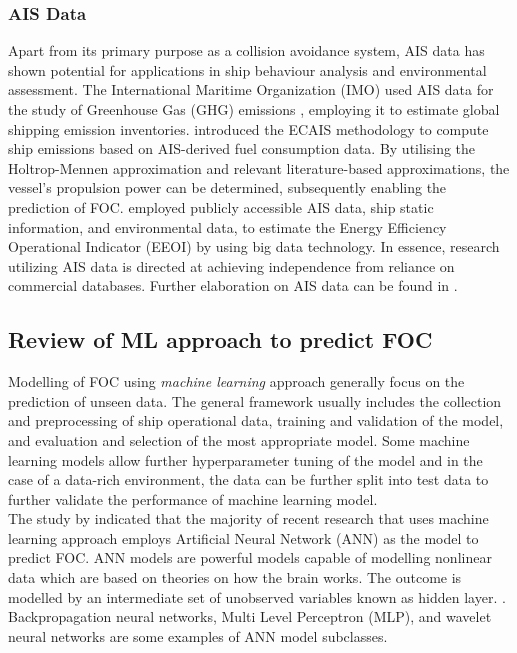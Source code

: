 \subsubsection*{\textbf{AIS Data}} Apart from its primary purpose as a collision avoidance system, AIS data has shown potential for applications in ship behaviour analysis and environmental assessment. The International Maritime Organization (IMO) used AIS data for the study of Greenhouse Gas (GHG) emissions , employing it to estimate global shipping emission inventories.  introduced the ECAIS methodology to compute ship emissions based on AIS-derived fuel consumption data. By utilising the Holtrop-Mennen approximation and relevant literature-based approximations, the vessel's propulsion power can be determined, subsequently enabling the prediction of FOC.  employed publicly accessible AIS data, ship static information, and environmental data, to estimate the Energy Efficiency Operational Indicator (EEOI) by using big data technology. In essence, research utilizing AIS data is directed at achieving independence from reliance on commercial databases. Further elaboration on AIS data can be found in .  

\subsection{Review of ML approach to predict FOC}\label{sec:ml_var_appl}

Modelling of FOC using \emph{machine learning} approach generally focus on the prediction of unseen data. The general framework usually includes the collection and preprocessing of ship operational data, training and validation of the model, and evaluation and selection of the most appropriate model. Some machine learning models allow further hyperparameter tuning of the model and in the case of a data-rich environment, the data can be further split into test data to further validate the performance of machine learning model.\\

The study by  indicated that the majority of recent research that uses machine learning approach employs Artificial Neural Network (ANN) as the model to predict FOC. ANN models are powerful models capable of modelling nonlinear data which are based on theories on how the brain works. The outcome is modelled by an intermediate set of unobserved variables known as hidden layer. . Backpropagation neural networks, Multi Level Perceptron (MLP), and wavelet neural networks are some examples of ANN model subclasses.\\

